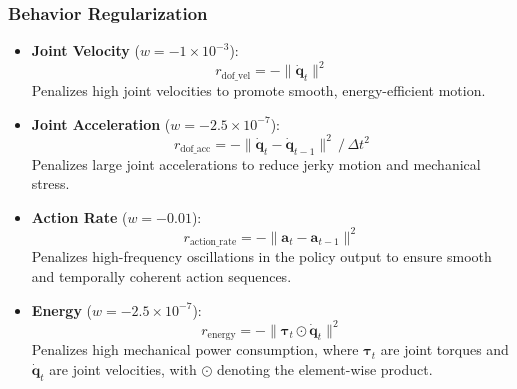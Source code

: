 \subsubsection*{Behavior Regularization}
\begin{itemize}
    \item \textbf{Joint Velocity} ($w = -1\times10^{-3}$):
    \begin{equation}
        r_{\text{dof\_vel}} = -\|\dot{\mathbf{q}}_t\|^2
    \end{equation}
    Penalizes high joint velocities to promote smooth, energy-efficient motion.
    \item \textbf{Joint Acceleration} ($w = -2.5\times10^{-7}$):
    \begin{equation}
        r_{\text{dof\_acc}} = -\|\dot{\mathbf{q}}_t - \dot{\mathbf{q}}_{t-1}\|^2 \,/\, \Delta t^2
    \end{equation}
    Penalizes large joint accelerations to reduce jerky motion and mechanical stress.
    \item \textbf{Action Rate} ($w = -0.01$):
    \begin{equation}
        r_{\text{action\_rate}} = -\|\mathbf{a}_t - \mathbf{a}_{t-1}\|^2
    \end{equation}
    Penalizes high-frequency oscillations in the policy output to ensure smooth and temporally coherent action sequences.
    \item \textbf{Energy} ($w = -2.5\times10^{-7}$):
    \begin{equation}
        r_{\text{energy}} = -\|\boldsymbol{\tau}_t \odot \dot{\mathbf{q}}_t\|^2
    \end{equation}
    Penalizes high mechanical power consumption, where $\boldsymbol{\tau}_t$ are joint torques and $\dot{\mathbf{q}}_t$ are joint velocities, with $\odot$ denoting the element-wise product.
\end{itemize}

